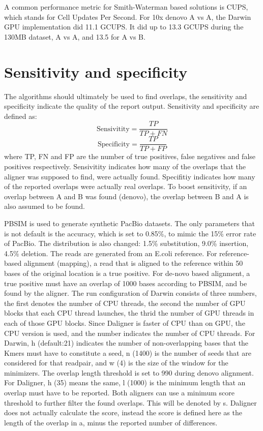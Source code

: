 \documentclass[../main/thesis.tex]{subfiles}
\begin{document}
A common performance metric for Smith-Waterman based solutions is CUPS, which stands for Cell Updates Per Second.
For 10x denovo A vs A, the Darwin GPU implementation did 11.1 GCUPS.
It did up to 13.3 GCUPS during the 130MB dataset, A vs A, and 13.5 for A vs B.


\section{Sensitivity and specificity}
The algorithms should ultimately be used to find overlaps, the sensitivity and specificity indicate the quality of the report output.
Sensitivity and specificity are defined as:
$$\text{Sensivitity} = \frac{TP}{TP + FN}$$
$$\text{Specificity} = \frac{TP}{TP + FP}$$
where TP, FN and FP are the number of true positives, false negatives and false positives respectively.
Sensivitity indicates how many of the overlaps that the aligner was supposed to find, were actually found.
Specifitiy indicates how many of the reported overlaps were actually real overlaps.
To boost sensitivity, if an overlap between A and B was found (denovo), the overlap between B and A is also assumed to be found.

PBSIM \cite{PBSIM} is used to generate synthetic PacBio datasets.
The only parameters that is not default is the accuracy, which is set to 0.85\%, to mimic the 15\% error rate of PacBio.
The distribution is also changed: 1.5\% substitution, 9.0\% insertion, 4.5\% deletion.
The reads are generated from an E.coli reference.
For reference-based alignment (mapping), a read that is aligned to the reference within 50 bases of the original location is a true positive.
For de-novo based alignment, a true positive must have an overlap of 1000 bases according to PBSIM, and be found by the aligner.
The run configuration of Darwin consists of three numbers, the first denotes the number of CPU threads, the second the number of GPU blocks that each CPU thread launches, the thrid the number of GPU threads in each of those GPU blocks.
Since Daligner is faster of CPU than on GPU, the CPU version is used, and the number indicates the number of CPU threads.
For Darwin, h (default:21) indicates the number of non-overlapping bases that the Kmers must have to constitute a seed, n (1400) is the number of seeds that are considered for that readpair, and w (4) is the size of the window for the minimizers.
The overlap length threshold is set to 990 during denovo alignment.
For Daligner, h (35) means the same, l (1000) is the minimum length that an overlap must have to be reported.
Both aligners can use a minimum score threshold to further filter the found overlaps.
This will be denoted by s.
Daligner does not actually calculate the score, instead the score is defined here as the length of the overlap in a, minus the reported number of differences.
\end{document}

